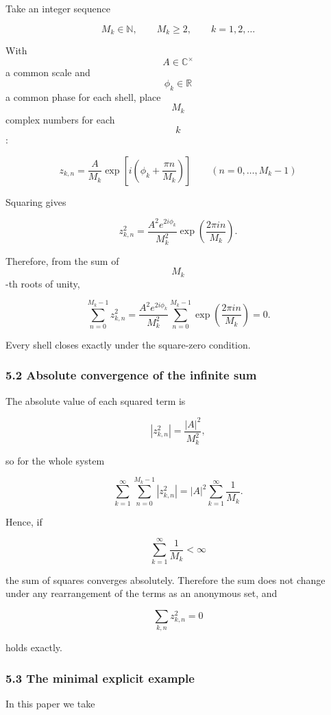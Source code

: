 \documentclass[
  a4paper,
]{article}
\begin{document}
Take an integer sequence

\[
M_k\in\mathbb N,
\qquad
M_k\ge2,
\qquad
k=1,2,\ldots
\]

With \[A\in\mathbb C^\times\] a common scale and \[\phi_k\in\mathbb R\]
a common phase for each shell, place \[M_k\] complex numbers for each
\[k\]:

\[
\boxed{
z_{k,n}
=
\frac{A}{M_k}
\exp\left[i\left(\phi_k+\frac{\pi n}{M_k}\right)\right]
}
\qquad
(n=0,\ldots,M_k-1)
\tag{10}
\]

Squaring gives

\[
z_{k,n}^2
=
\frac{A^2e^{2i\phi_k}}{M_k^2}
\exp\left(\frac{2\pi i n}{M_k}\right).
\tag{11}
\]

Therefore, from the sum of \[M_k\]-th roots of unity,

\[
\sum_{n=0}^{M_k-1}z_{k,n}^2
=
\frac{A^2e^{2i\phi_k}}{M_k^2}
\sum_{n=0}^{M_k-1}
\exp\left(\frac{2\pi i n}{M_k}\right)
=0.
\tag{12}
\]

Every shell closes exactly under the square-zero condition.

\subsubsection{5.2 Absolute convergence of the infinite
sum}\label{absolute-convergence-of-the-infinite-sum}

The absolute value of each squared term is

\[
|z_{k,n}^2|
=
\frac{|A|^2}{M_k^2},
\]

so for the whole system

\[
\sum_{k=1}^{\infty}
\sum_{n=0}^{M_k-1}|z_{k,n}^2|
=
|A|^2
\sum_{k=1}^{\infty}\frac{1}{M_k}.
\tag{13}
\]

Hence, if

\[
\boxed{
\sum_{k=1}^{\infty}\frac{1}{M_k}<\infty
}
\tag{14}
\]

the sum of squares converges absolutely. Therefore the sum does not
change under any rearrangement of the terms as an anonymous set, and

\[
\boxed{
\sum_{k,n}z_{k,n}^2=0
}
\tag{15}
\]

holds exactly.

\subsubsection{5.3 The minimal explicit
example}\label{the-minimal-explicit-example}

In this paper we take
\end{document}
